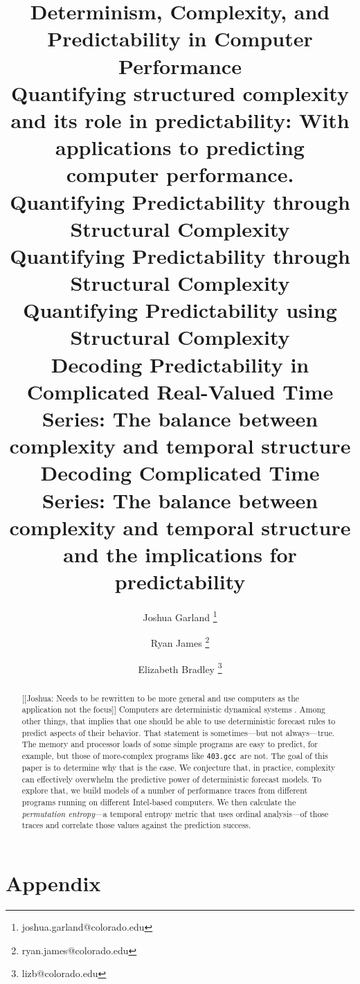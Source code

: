 \documentclass{article}
\title{Determinism, Complexity, and Predictability in Computer Performance\\
Quantifying structured complexity and its role in predictability: With applications to predicting computer performance.
\\ Quantifying Predictability through Structural Complexity \\
{\color{green}Quantifying Predictability through Structural Complexity} 
\\ Quantifying Predictability using Structural Complexity 
\\Decoding Predictability in Complicated Real-Valued Time Series: The balance between complexity and temporal structure
\\Decoding Complicated Time Series: The balance between complexity and temporal structure and the implications for predictability
}
\author[1]{Joshua Garland \thanks{joshua.garland@colorado.edu}}
\author[1]{Ryan James \thanks{ryan.james@colorado.edu}}
\author[1,2]{Elizabeth Bradley \thanks{lizb@colorado.edu}}
\affil[1]{Department of Computer Science\\
  University of Colorado at Boulder\\
  Colorado, USA
}
\affil[2]{Santa Fe Institute\\
  New Mexico, USA
}
\newcommand{\gcc}{{\tt 403.gcc}~}
\begin{document}
\maketitle





\begin{abstract}
[[Joshua: Needs to be rewritten to be more general and use computers as the application not the focus]]  Computers are deterministic dynamical systems \cite{mytkowicz09}.
  Among other things, that implies that one should be able to use
  deterministic forecast rules to predict aspects of their behavior.
  That statement is sometimes---but not always---true. The memory and
  processor loads of some simple programs are easy to predict, for
  example, but those of more-complex programs like \gcc are not.
  The goal of this paper is to determine why that is the case. We
  conjecture that, in practice, complexity can effectively overwhelm
  the predictive power of deterministic forecast models. To explore
  that, we build models of a number of performance traces from
  different programs running on different Intel-based computers. We
  then calculate the \emph{permutation entropy}---a temporal entropy
  metric that uses ordinal analysis---of those traces and correlate
  those values against the prediction success.
\end{abstract}















\section{Appendix}
\end{document}
